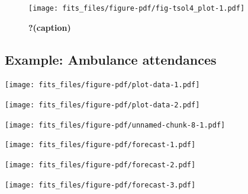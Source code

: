 \documentclass[11pt,a4paper,]{article}
\begin{document}
\begin{figure}

{\centering \texttt{[image: fits\_files/figure-pdf/fig-tsol4\_plot-1.pdf]}

}

\caption{\label{fig-tsol4_plot}\textbf{?(caption)}}

\end{figure}

\FloatBarrier

\hypertarget{example-ambulance-attendances}{%
\subsection{Example: Ambulance
attendances}\label{example-ambulance-attendances}}

\texttt{[image: fits\_files/figure-pdf/plot-data-1.pdf]}

\texttt{[image: fits\_files/figure-pdf/plot-data-2.pdf]}

\texttt{[image: fits\_files/figure-pdf/unnamed-chunk-8-1.pdf]}

\texttt{[image: fits\_files/figure-pdf/forecast-1.pdf]}

\texttt{[image: fits\_files/figure-pdf/forecast-2.pdf]}

\texttt{[image: fits\_files/figure-pdf/forecast-3.pdf]}

\printbibliography
\end{document}
